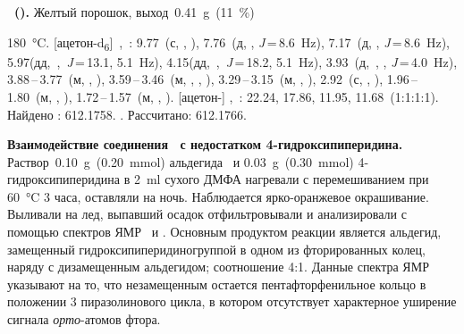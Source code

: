 \textbf{~().}
Желтый порошок, выход~\SI{0.41}{\gram}~(\SI{11}{\percent})
\begin{experimental}[]
     \SI{180}{\celsius}.
    [ацетон­-d\textsubscript{6}]~\chemdelta{},~\si{\ppm}: 9.77~(с, , ), 7.76~(д, , \textit{J}\,=\,8.6~\si{\hertz}), 7.17~(д, , \textit{J}\,=\,8.6~\si{\hertz}), 5.97(дд,~,~\textit{J}\,=\,13.1, 5.1~\si{\hertz}), 4.15(дд,~,~\textit{J}\,=\,18.2, 5.1~\si{\hertz}), 3.93~(д,~, , \textit{J}\,=\,4.0~\si{\hertz}), 3.88\,--\,3.77~(м, , ), 3.59\,--\,3.46~(м, , , ), 3.29\,--\,3.15~(м, , ), 2.92~(с, , ), 1.96\,--\,1.80~(м, , ), 1.72\,--\,1.57~(м, , ).
    [ацетон-] \chemdelta,~\si{\ppm}: 22.24, 17.86, 11.95, 11.68~(1:1:1:1).
     Найдено \ce{[M+]}: \num{612.1758}. . Рассчитано:  \num{612.1766}.
\end{experimental}

\textbf{Взаимодействие соединения~ с недостатком 4-гидроксипиперидина.}
Раствор~\SI{0.10}{\gram}~(\SI{0.20}{\mmol}) альдегида~ и \SI{0.03}{\gram}~(\SI{0.30}{\mmol}) 4-гидроксипиперидина в \SI{2}{\ml} сухого ДМФА нагревали с перемешиванием при \SI{60}{\celsius} 3 часа, оставляли на ночь. Наблюдается ярко-оранжевое окрашивание. Выливали на лед, выпавший осадок отфильтровывали и анализировали с помощью спектров ЯМР~ и . Основным продуктом реакции является альдегид, замещенный гидроксипиперидиногруппой в одном из фторированных колец, наряду с дизамещенным альдегидом; соотношение 4:1. Данные спектра ЯМР~ указывают на то, что незамещенным остается пентафторфенильное кольцо в положении 3 пиразолинового цикла, в котором отсутствует характерное уширение сигнала \emph{орто}-атомов фтора.


